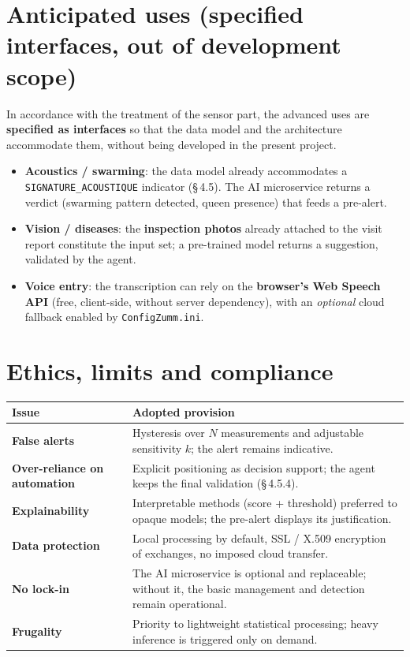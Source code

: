 \section{Anticipated uses (specified interfaces, out of development scope)}
In accordance with the treatment of the sensor part, the advanced uses are
\textbf{specified as interfaces} so that the data model and the architecture
accommodate them, without being developed in the present project.
\begin{itemize}
  \item \textbf{Acoustics / swarming}: the data model already accommodates a
        \texttt{SIGNATURE\_ACOUSTIQUE} indicator (§\,4.5). The AI microservice
        returns a verdict (swarming pattern detected, queen presence) that feeds
        a pre-alert.
  \item \textbf{Vision / diseases}: the \textbf{inspection photos} already
        attached to the visit report constitute the input set; a pre-trained
        model returns a suggestion, validated by the agent.
  \item \textbf{Voice entry}: the transcription can rely on the \textbf{browser's
        Web Speech API} (free, client-side, without server dependency), with an
        \emph{optional} cloud fallback enabled by \texttt{ConfigZumm.ini}.
\end{itemize}

\section{Ethics, limits and compliance}
\begin{xltabular}{\textwidth}{>{\bfseries}p{4.4cm} X}
\toprule
\textbf{Issue} & \textbf{Adopted provision} \\
\midrule
\endhead
False alerts & Hysteresis over $N$ measurements and adjustable sensitivity $k$; the alert remains indicative. \\
Over-reliance on automation & Explicit positioning as decision support; the agent keeps the final validation (§\,4.5.4). \\
Explainability & Interpretable methods (score + threshold) preferred to opaque models; the pre-alert displays its justification. \\
Data protection & Local processing by default, SSL / X.509 encryption of exchanges, no imposed cloud transfer. \\
No lock-in & The AI microservice is optional and replaceable; without it, the basic management and detection remain operational. \\
Frugality & Priority to lightweight statistical processing; heavy inference is triggered only on demand. \\
\bottomrule
\end{xltabular}

